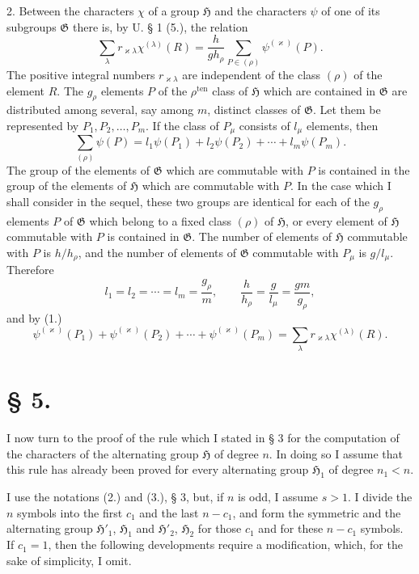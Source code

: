 \documentclass[11pt]{article}
\newcommand{\Hgr}{\mathfrak{H}}
\newcommand{\Ggr}{\mathfrak{G}}
\newcommand{\ten}{\mathrm{ten}}
\begin{document}
2. Between the characters $\chi$ of a group $\Hgr$ and the characters $\psi$ of one of its subgroups $\Ggr$ there is, by U. § 1 (5.), the relation
\begin{equation}\tag{1.}
 \sum_\lambda r_{\varkappa\lambda}\chi^{(\lambda)}(R)=\frac{h}{g h_\rho}\sum_{P\in(\rho)}\psi^{(\varkappa)}(P).
\end{equation}
The positive integral numbers $r_{\varkappa\lambda}$ are independent of the class $(\rho)$ of the element $R$. The $g_\rho$ elements $P$ of the $\rho^{\ten}$ class of $\Hgr$ which are contained in $\Ggr$ are distributed among several, say among $m$, distinct classes of $\Ggr$. Let them be represented by $P_1,P_2,\ldots,P_m$. If the class of $P_\mu$ consists of $l_\mu$ elements, then
\[
 \sum_{(\rho)}\psi(P)=l_1\psi(P_1)+l_2\psi(P_2)+\cdots+l_m\psi(P_m).
\]
The group of the elements of $\Ggr$ which are commutable with $P$ is contained in the group of the elements of $\Hgr$ which are commutable with $P$. In the case which I shall consider in the sequel, these two groups are identical for each of the $g_\rho$ elements $P$ of $\Ggr$ which belong to a fixed class $(\rho)$ of $\Hgr$, or every element of $\Hgr$ commutable with $P$ is contained in $\Ggr$. The number of elements of $\Hgr$ commutable with $P$ is $h/h_\rho$, and the number of elements of $\Ggr$ commutable with $P_\mu$ is $g/l_\mu$. Therefore
\[
 l_1=l_2=\cdots=l_m=\frac{g_\rho}{m},	\qquad \frac{h}{h_\rho}=\frac{g}{l_\mu}=\frac{gm}{g_\rho},
\]
and by (1.)
\begin{equation}\tag{2.}
 \psi^{(\varkappa)}(P_1)+\psi^{(\varkappa)}(P_2)+\cdots+\psi^{(\varkappa)}(P_m)=\sum_\lambda r_{\varkappa\lambda}\chi^{(\lambda)}(R).
\end{equation}

\section*{§ 5.}

I now turn to the proof of the rule which I stated in § 3 for the computation of the characters of the alternating group $\Hgr$ of degree $n$. In doing so I assume that this rule has already been proved for every alternating group $\Hgr_1$ of degree $n_1<n$.

I use the notations (2.) and (3.), § 3, but, if $n$ is odd, I assume $s>1$. I divide the $n$ symbols into the first $c_1$ and the last $n-c_1$, and form the symmetric and the alternating group $\Hgr'_1$, $\Hgr_1$ and $\Hgr'_2$, $\Hgr_2$ for those $c_1$ and for these $n-c_1$ symbols. If $c_1=1$, then the following developments require a modification, which, for the sake of simplicity, I omit.
\end{document}
